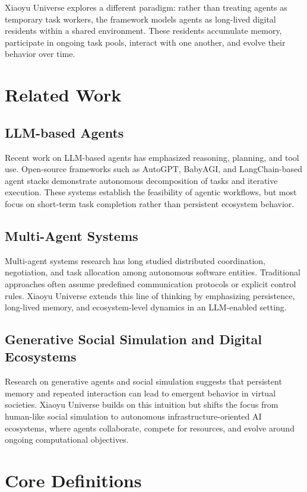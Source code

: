 \documentclass[11pt]{article}
\begin{document}
Xiaoyu Universe explores a different paradigm: rather than treating agents as temporary task workers, the framework models agents as long-lived digital residents within a shared environment. These residents accumulate memory, participate in ongoing task pools, interact with one another, and evolve their behavior over time.

\section{Related Work}
\subsection{LLM-based Agents}
Recent work on LLM-based agents has emphasized reasoning, planning, and tool use. Open-source frameworks such as AutoGPT, BabyAGI, and LangChain-based agent stacks demonstrate autonomous decomposition of tasks and iterative execution. These systems establish the feasibility of agentic workflows, but most focus on short-term task completion rather than persistent ecosystem behavior.

\subsection{Multi-Agent Systems}
Multi-agent systems research has long studied distributed coordination, negotiation, and task allocation among autonomous software entities. Traditional approaches often assume predefined communication protocols or explicit control rules. Xiaoyu Universe extends this line of thinking by emphasizing persistence, long-lived memory, and ecosystem-level dynamics in an LLM-enabled setting.

\subsection{Generative Social Simulation and Digital Ecosystems}
Research on generative agents and social simulation suggests that persistent memory and repeated interaction can lead to emergent behavior in virtual societies. Xiaoyu Universe builds on this intuition but shifts the focus from human-like social simulation to autonomous infrastructure-oriented AI ecosystems, where agents collaborate, compete for resources, and evolve around ongoing computational objectives.

\section{Core Definitions}
\end{document}
